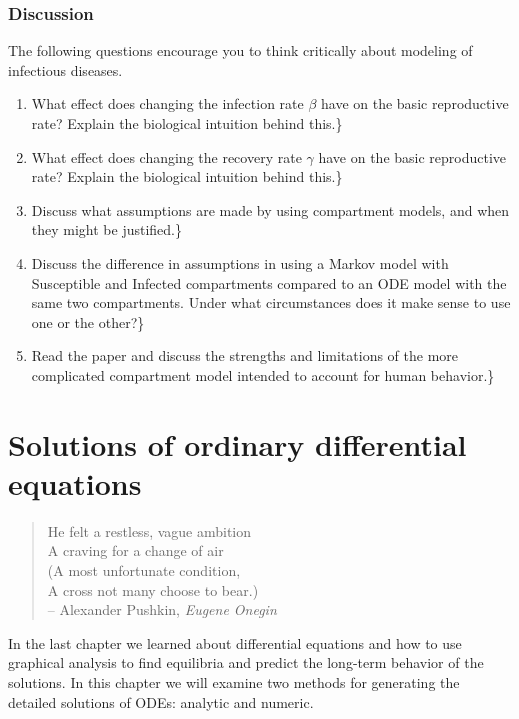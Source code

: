 \documentclass[
  letterpaper,
  DIV=11,
  numbers=noendperiod]{scrreprt}
\begin{document}
\hypertarget{discussion}{%
\subsection{Discussion}\label{discussion}}

The following questions encourage you to think critically about modeling
of infectious diseases.

\begin{enumerate}
\def\labelenumi{\arabic{enumi}.}
\item
  What effect does changing the infection rate \(\beta\) have on the
  basic reproductive rate? Explain the biological intuition behind
  this.\}
\item
  What effect does changing the recovery rate \(\gamma\) have on the
  basic reproductive rate? Explain the biological intuition behind
  this.\}
\item
  Discuss what assumptions are made by using compartment models, and
  when they might be justified.\}
\item
  Discuss the difference in assumptions in using a Markov model with
  Susceptible and Infected compartments compared to an ODE model with
  the same two compartments. Under what circumstances does it make sense
  to use one or the other?\}
\item
  Read the paper \cite{agusto_mathematical_2015} and discuss the
  strengths and limitations of the more complicated compartment model
  intended to account for human behavior.\}
\end{enumerate}


\hypertarget{solutions-of-ordinary-differential-equations}{%
\chapter{Solutions of ordinary differential
equations}\label{solutions-of-ordinary-differential-equations}}

\begin{quote}
He felt a restless, vague ambition\\
A craving for a change of air\\
(A most unfortunate condition,\\
A cross not many choose to bear.)\\
-- Alexander Pushkin, \emph{Eugene Onegin}
\end{quote}

In the last chapter we learned about differential equations and how to
use graphical analysis to find equilibria and predict the long-term
behavior of the solutions. In this chapter we will examine two methods
for generating the detailed solutions of ODEs: analytic and numeric.
\end{document}
